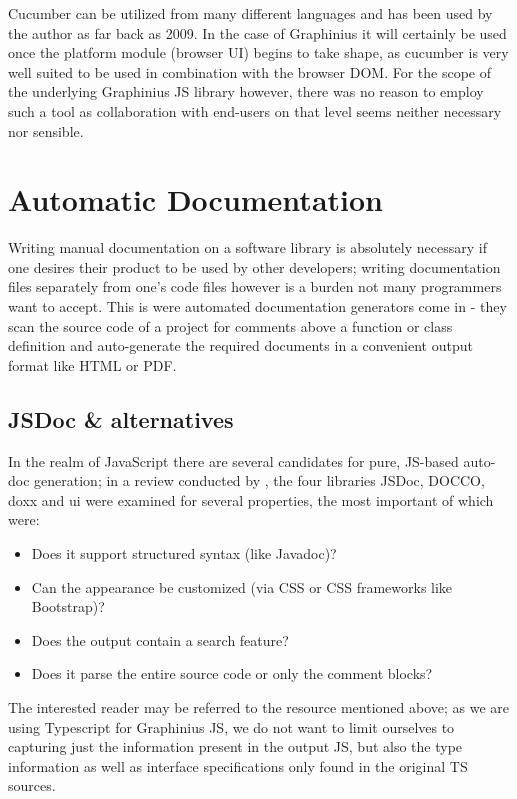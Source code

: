 	Cucumber can be utilized from many different languages and has been used by the author as far back as 2009. In the case of Graphinius it will certainly be used once the platform module (browser UI) begins to take shape, as cucumber is very well suited to be used in combination with the browser DOM. For the scope of the underlying Graphinius JS library however, there was no reason to employ such a tool as collaboration with end-users on that level seems neither necessary nor sensible.


\section{Automatic Documentation}
\label{sect:documentation}

	Writing manual documentation on a software library is absolutely necessary if one desires their product to be used by other developers; writing documentation files separately from one's code files however is a burden not many programmers want to accept. This is were automated documentation generators come in - they scan the source code of a project for comments above a function or class definition and auto-generate the required documents in a convenient output format like HTML or PDF. 
	
	
	\subsection{JSDoc \& alternatives}
	\label{ssect:jsdoc}
	
	In the realm of JavaScript there are several candidates for pure, JS-based auto-doc generation; in a review conducted by \citep{JSDocRef}, the four libraries JSDoc, DOCCO, doxx and ui were examined for several properties, the most important of which were:
	
	\begin{itemize}
		\item Does it support structured syntax (like Javadoc)?
		\item Can the appearance be customized (via CSS or CSS frameworks like Bootstrap)?
		\item Does the output contain a search feature?
		\item Does it parse the entire source code or only the comment blocks?
	\end{itemize}
	
	The interested reader may be referred to the resource mentioned above; as we are using Typescript for Graphinius JS, we do not want to limit ourselves to capturing just the information present in the output JS, but also the type information as well as interface specifications only found in the original TS sources.
	
